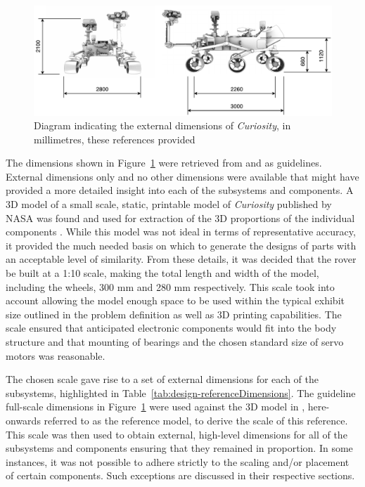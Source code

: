       \begin{figure}[h]
        \centering
        \includegraphics[width=0.9\linewidth]{figures/mechDesign-curiosityDimensions}
        \caption[Diagram indicating the external dimensions of \textit{Curiosity}, in millimetres, these references provided]{Diagram indicating the external dimensions of \textit{Curiosity}, in millimetres, these references provided \cite{nasa3D}}
        \label{fig:mechdesign-curiosityDimensions}
      \end{figure}
      
      The dimensions shown in Figure~\ref{fig:mechdesign-curiosityDimensions} were retrieved from \cite{nasajulypresskit} and \cite{roverThermal_2016} as guidelines. External dimensions only and no other dimensions were available that might have provided a more detailed insight into each of the subsystems and components. A 3D model of a small scale, static, printable model of \textit{Curiosity} published by NASA was found and used for extraction of the 3D proportions of the individual components \cite{nasa3Dprint}. While this model was not ideal in terms of representative accuracy, it provided the much needed basis on which to generate the designs of parts with an acceptable level of similarity. From these details, it was decided that the rover be built at a 1:10 scale, making the total length and width of the model, including the wheels, 300 mm and 280 mm respectively. This scale took into account allowing the model enough space to be used within the typical exhibit size outlined in the problem definition as well as 3D printing capabilities. The scale ensured that anticipated electronic components would fit into the body structure and that mounting of bearings and the chosen standard size of servo motors was reasonable.
      
      The chosen scale gave rise to a set of external dimensions for each of the subsystems, highlighted in Table~\ref{tab:design-referenceDimensions}. The guideline full-scale dimensions in Figure~\ref{fig:mechdesign-curiosityDimensions} were used against the 3D model in \cite{nasa3Dprint}, here-onwards referred to as the reference model, to derive the scale of this reference. This scale was then used to obtain external, high-level dimensions for all of the subsystems and components ensuring that they remained in proportion. In some instances, it was not possible to adhere strictly to the scaling and/or placement of certain components. Such exceptions are discussed in their respective sections.
            
